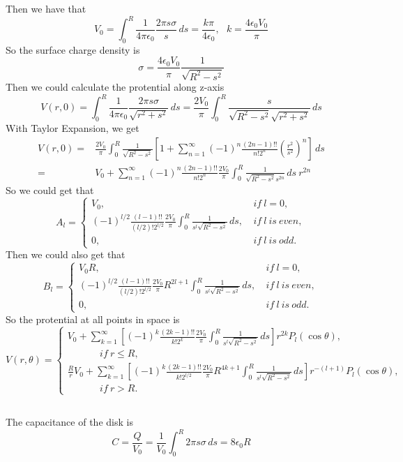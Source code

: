\documentclass[10.5pt]{article}
\begin{document}
Then we have that $$V_0 = \int_0^R \frac{1}{4\pi\epsilon_0}\frac{2\pi s\sigma }{s} \,ds = \frac{k\pi}{4\epsilon_0}, ~~~k = \frac{4\epsilon_0V_0}{\pi}$$\indent
So the surface charge density is $$\sigma = \frac{4\epsilon_0V_0}{\pi}\frac{1}{\sqrt{R^2-s^2}}$$\indent
Then we could calculate the protential along z-axis $$V(r,0) = \int_0^R \frac{1}{4\pi\epsilon_0}\frac{2\pi s\sigma}{\sqrt{r^2+s^2}} \,ds= \frac{2V_0}{\pi} \int_0^R \frac{s}{\sqrt{R^2-s^2}\sqrt{r^2+s^2}} \,ds$$\indent
With Taylor Expansion, we get \begin{align*}
    V(r,0) =&\frac{2V_0}{\pi} \int_0^R \frac{1}{\sqrt{R^2-s^2}} \left[1 + \sum_{n=1}^{\infty} (-1)^n \frac{(2n-1)!!}{n! 2^n} \left(\frac{r^2}{s^2}\right)^n\right] \,ds\\
    =&V_0 + \sum_{n=1}^{\infty} (-1)^n \frac{(2n-1)!!}{n! 2^n}\frac{2V_0}{\pi} \int_0^R \frac{1}{\sqrt{R^2-s^2} s^{2n}} \,ds ~r^{2n}
\end{align*}\indent
So we could get that\Large $$A_l = \begin{cases}
    V_0, & ~if ~l=0,\\
    (-1)^{l/2} \frac{(l-1)!!}{(l/2)! 2^{l/2}}\frac{2V_0}{\pi} \int_0^R \frac{1}{s^{l} \sqrt{R^2-s^2}} \,ds, & ~if ~l ~is ~even,\\
    0, & ~if ~l ~is ~odd.
\end{cases}$$\normalsize\indent
Then we could also get that\Large $$B_l = \begin{cases}
    V_0R, & ~if ~l=0,\\
    (-1)^{l/2} \frac{(l-1)!!}{(l/2)! 2^{l/2}}\frac{2V_0}{\pi} R^{2l+1} \int_0^R \frac{1}{s^{l} \sqrt{R^2-s^2}} \,ds, & ~if ~l ~is ~even,\\
    0, & ~if ~l ~is ~odd.
\end{cases}$$\normalsize\indent
So the protential at all points in space is\Large $$V(r,\theta) = \begin{cases}
    V_0 + \sum_{k=1}^{\infty} \left[(-1)^{k} \frac{(2k-1)!!}{k! 2^{k}}\frac{2V_0}{\pi} \int_0^R \frac{1}{s^{l} \sqrt{R^2-s^2}} \,ds\right]r^{2k} P_l(\cos\theta),\\
    ~~~~~~~~~~~~~~~if ~r\leqslant R,\\
    \frac{R}{r}V_0 + \sum_{k=1}^{\infty} \left[(-1)^{k} \frac{(2k-1)!!}{k! 2^{l/2}}\frac{2V_0}{\pi} R^{4k+1} \int_0^R \frac{1}{s^{l} \sqrt{R^2-s^2}} \,ds\right] r^{-(l+1)} P_l(\cos\theta),\\
    ~~~~~~~~~~~~~~~if~r>R.
\end{cases}$$\normalsize
\subsection{}
The capacitance of the disk is $$C = \frac{Q}{V_0} = \frac{1}{V_0} \int_0^R 2\pi s\sigma \,ds = 8\epsilon_0 R$$
\end{document}
